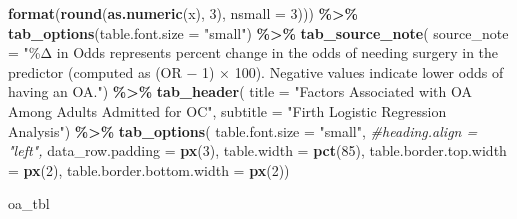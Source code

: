 \documentclass[
]{article}
\newenvironment{Shaded}{\begin{snugshade}}{\end{snugshade}}
\newcommand{\AttributeTok}[1]{\textcolor[rgb]{0.13,0.29,0.53}{#1}}
\newcommand{\CommentTok}[1]{\textcolor[rgb]{0.56,0.35,0.01}{\textit{#1}}}
\newcommand{\DecValTok}[1]{\textcolor[rgb]{0.00,0.00,0.81}{#1}}
\newcommand{\FunctionTok}[1]{\textcolor[rgb]{0.13,0.29,0.53}{\textbf{#1}}}
\newcommand{\NormalTok}[1]{#1}
\newcommand{\SpecialCharTok}[1]{\textcolor[rgb]{0.81,0.36,0.00}{\textbf{#1}}}
\newcommand{\StringTok}[1]{\textcolor[rgb]{0.31,0.60,0.02}{#1}}
\begin{document}
\begin{Shaded}
\begin{Highlighting}[]
                            \FunctionTok{format}\NormalTok{(}\FunctionTok{round}\NormalTok{(}\FunctionTok{as.numeric}\NormalTok{(x), }\DecValTok{3}\NormalTok{), }\AttributeTok{nsmall =} \DecValTok{3}\NormalTok{))) }\SpecialCharTok{\%\textgreater{}\%}
  \FunctionTok{tab\_options}\NormalTok{(}\AttributeTok{table.font.size =} \StringTok{"small"}\NormalTok{) }\SpecialCharTok{\%\textgreater{}\%}
  \FunctionTok{tab\_source\_note}\NormalTok{(}
    \AttributeTok{source\_note =} \StringTok{"\%Δ in Odds represents percent change in the odds of needing surgery}
\StringTok{    in the predictor (computed as (OR − 1) × 100). Negative values indicate lower}
\StringTok{    odds of having an OA."}\NormalTok{) }\SpecialCharTok{\%\textgreater{}\%} 
  \FunctionTok{tab\_header}\NormalTok{(}
    \AttributeTok{title =} \StringTok{"Factors Associated with OA Among Adults Admitted for OC"}\NormalTok{,}
    \AttributeTok{subtitle =} \StringTok{"Firth Logistic Regression Analysis"}\NormalTok{) }\SpecialCharTok{\%\textgreater{}\%} 
  \FunctionTok{tab\_options}\NormalTok{(}
    \AttributeTok{table.font.size =} \StringTok{"small"}\NormalTok{,}
    \CommentTok{\#heading.align = "left",}
    \AttributeTok{data\_row.padding =} \FunctionTok{px}\NormalTok{(}\DecValTok{3}\NormalTok{),}
    \AttributeTok{table.width =} \FunctionTok{pct}\NormalTok{(}\DecValTok{85}\NormalTok{),}
    \AttributeTok{table.border.top.width =} \FunctionTok{px}\NormalTok{(}\DecValTok{2}\NormalTok{),}
    \AttributeTok{table.border.bottom.width =} \FunctionTok{px}\NormalTok{(}\DecValTok{2}\NormalTok{))}

\NormalTok{oa\_tbl}
\end{Highlighting}
\end{Shaded}
\end{document}
